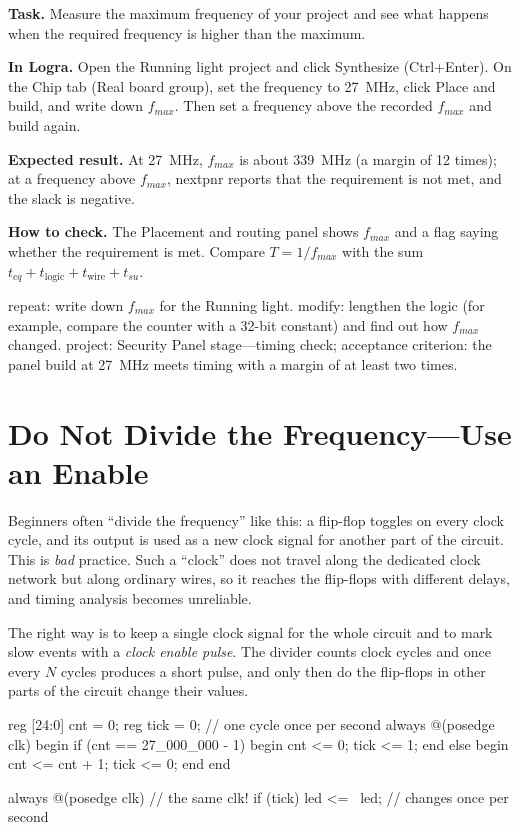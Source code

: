 \begin{diybox}
\textbf{Task.} Measure the maximum frequency of your project and see what happens when the required frequency is higher than the maximum.

\textbf{In Logra.} Open the Running light project and click Synthesize (Ctrl+Enter). On the Chip tab (Real board group), set the frequency to 27~MHz, click Place and build, and write down $f_{max}$. Then set a frequency above the recorded $f_{max}$ and build again.

\textbf{Expected result.} At 27~MHz, $f_{max}$ is about 339~MHz (a margin of 12 times); at a frequency above $f_{max}$, nextpnr reports that the requirement is not met, and the slack is negative.

\textbf{How to check.} The Placement and routing panel shows $f_{max}$ and a flag saying whether the requirement is met. Compare $T=1/f_{max}$ with the sum $t_{cq}+t_{\text{logic}}+t_{\text{wire}}+t_{su}$.

 repeat: write down $f_{max}$ for the Running light.  modify: lengthen the logic (for example, compare the counter with a 32-bit constant) and find out how $f_{max}$ changed.  project: Security Panel stage---timing check; acceptance criterion: the panel build at 27~MHz meets timing with a margin of at least two times.
\end{diybox}

\section{Do Not Divide the Frequency---Use an Enable}

Beginners often ``divide the frequency'' like this: a flip-flop toggles on
every clock cycle, and its output is used as a new clock signal for another
part of the circuit. This is \emph{bad} practice. Such a ``clock'' does not
travel along the dedicated clock network but along ordinary wires, so it
reaches the flip-flops with different delays, and timing analysis becomes
unreliable.

The right way is to keep a single clock signal for the whole circuit and to
mark slow events with a \emph{clock enable pulse}. The divider counts clock
cycles and once every $N$ cycles produces a short  pulse, and only
then do the flip-flops in other parts of the circuit change their values.

\begin{vcode}
reg [24:0] cnt = 0;
reg        tick = 0;                      // one cycle once per second
always @(posedge clk) begin
    if (cnt == 27_000_000 - 1) begin
        cnt  <= 0;
        tick <= 1;
    end else begin
        cnt  <= cnt + 1;
        tick <= 0;
    end
end

always @(posedge clk)                      // the same clk!
    if (tick) led <= ~led;                 // changes once per second
\end{vcode}

